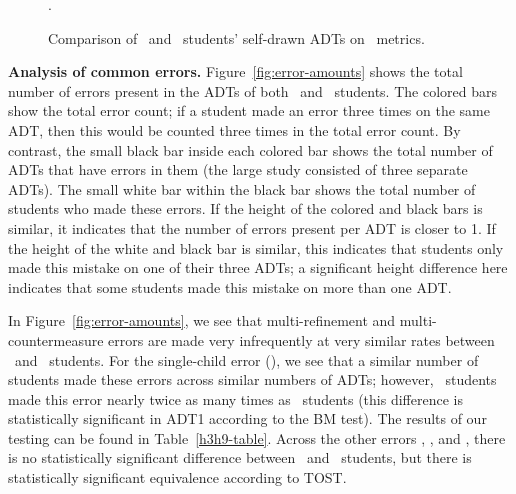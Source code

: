 \begin{figure}[t]
    \caption{Comparison of \ICS\ and \SEC\ students' self-drawn ADTs on \ metrics. }.
    \label{fig:adt3-comparison}
\end{figure}



\textbf{Analysis of common errors.}
Figure~\ref{fig:error-amounts} shows the total number of errors present in the ADTs of both \ICS\ and \SEC\ students. The colored bars show the total error count; if a student made an error three times on the same ADT, then this would be counted three times in the total error count. By contrast, the small black bar inside each colored bar shows the total number of ADTs that have errors in them (the large study consisted of three separate ADTs). The small white bar within the black bar shows the total number of students who made these errors. If the height of the colored and black bars is similar, it indicates that the number of errors present per ADT is closer to 1. If the height of the white and black bar is similar, this indicates that students only made this mistake on one of their three ADTs; a significant height difference here indicates that some students made this mistake on more than one ADT.

In Figure~\ref{fig:error-amounts}, we see that multi-refinement and multi-countermeasure errors are made very infrequently at very similar rates between \ICS\ and \SEC\ students. For the single-child error (\hypothesis{\hypoSingleChildNodes}), we see that a similar number of students made these errors across similar numbers of ADTs; however, \ICS\ students made this error nearly twice as many times as \SEC\ students (this difference is statistically significant in ADT1 according to the BM test). The results of our testing can be found in Table~\ref{h3h9-table}.  Across the other errors \hypothesis{\hypoMultipleParent}, \hypothesis{\hypoMultipleRefinement}, and \hypothesis{\hypoMulipleCountermeasure}, there is no statistically significant difference between \ICS\ and \SEC\ students, but there is statistically significant equivalence according to TOST.


